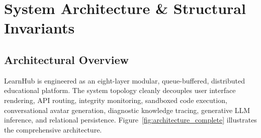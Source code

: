 \documentclass[journal]{IEEEtran}
\begin{document}
\section{System Architecture \& Structural Invariants}
\label{sec:architecture}
\subsection{Architectural Overview}
LearnHub is engineered as an eight-layer modular, queue-buffered, distributed educational platform. The system topology cleanly decouples user interface rendering, API routing, integrity monitoring, sandboxed code execution, conversational avatar generation, diagnostic knowledge tracing, generative LLM inference, and relational persistence. Figure~\ref{fig:architecture_complete} illustrates the comprehensive architecture.
\end{document}
